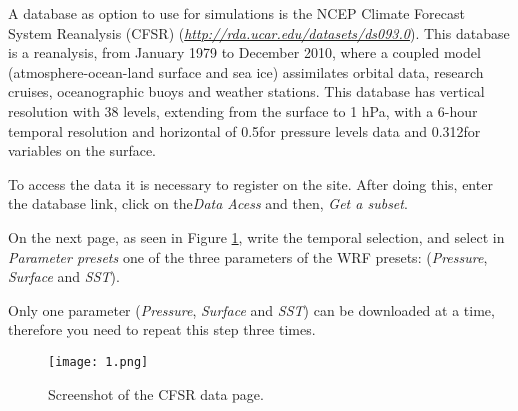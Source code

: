 \noindent A database as option to use for simulations is the NCEP Climate Forecast System Reanalysis (CFSR)
 (\textcolor{bleu_cite}{\href{http://rda.ucar.edu/datasets/ds093.0}{\textit{http://rda.ucar.edu/datasets/ds093.0}}}).
This database is a reanalysis, from January 1979 to December 2010, where a coupled model (atmosphere-ocean-land surface and sea ice)
assimilates orbital data, research cruises, oceanographic buoys and weather stations. This database
has vertical resolution with 38 levels, extending from the surface to 1 hPa, with a 6-hour temporal resolution
and horizontal of 0.5\degree for pressure levels data and 0.312\degree for variables on the surface.
\bigskip

\noindent To access the data it is necessary to register on the site. After doing this, enter the database link,
click on the\textit{Data Acess} and then, \textit{Get a subset}.
\bigskip

\noindent On the next page, as seen in Figure \textcolor{bleu_cite}{\ref{detalhacfsr}}, write the temporal selection,
and select in \textit {Parameter presets} one of the three parameters of the WRF presets: (\textit{Pressure},
\textit{Surface} and \textit{SST}). 
\bigskip

\begin{tcolorbox}[enhanced,
    grow to left by=0cm,%
    grow to right by=0cm,%
    enlarge top by=0cm,%
    enlarge bottom by=0cm,%
    tcbox raise base,
    boxrule=1.0pt,
    left=18mm,
    colframe=red!50!black,coltext=red!25!black,colback=red!10!white,
    overlay={\begin{tcbclipinterior}\fill[red!75!blue!50!white] (frame.south west)
      rectangle node[text=white,font=\sffamily\bfseries\footnotesize,rotate=0] {WARNING} ([xshift=18mm]frame.north west);\end{tcbclipinterior}}]
      Only one parameter (\textit{Pressure}, \textit{Surface} and \textit{SST}) can be downloaded at a time, therefore you need to repeat this step three times.
\end{tcolorbox}
\bigskip

\begin{figure}[H]
    \centering
    \texttt{[image: 1.png]}
    \caption{Screenshot of the CFSR data page.}
    \label{detalhacfsr}
\end{figure}
\bigskip

